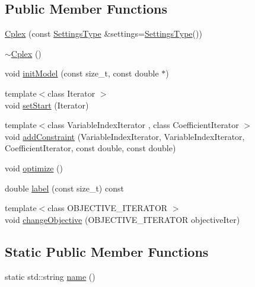 \subsection*{Public Member Functions}
\begin{DoxyCompactItemize}
\item 
\hyperlink{classnifty_1_1ilp__backend_1_1Cplex_ab9abc60e704f82a5b7d480e4fab2e39f}{Cplex} (const \hyperlink{classnifty_1_1ilp__backend_1_1Cplex_a55f68efdbd0060526e09b037be4e6a49}{Settings\+Type} \&settings=\hyperlink{classnifty_1_1ilp__backend_1_1Cplex_a55f68efdbd0060526e09b037be4e6a49}{Settings\+Type}())
\item 
\hyperlink{classnifty_1_1ilp__backend_1_1Cplex_a5bebd6813a2fbb17fa2b5532c3d21000}{$\sim$\+Cplex} ()
\item 
void \hyperlink{classnifty_1_1ilp__backend_1_1Cplex_a52a0ed3e137e56d17daaaf4542d3290c}{init\+Model} (const size\+\_\+t, const double $\ast$)
\item 
{\footnotesize template$<$class Iterator $>$ }\\void \hyperlink{classnifty_1_1ilp__backend_1_1Cplex_a1c773d38cf7a0434247a87ee96531c57}{set\+Start} (Iterator)
\item 
{\footnotesize template$<$class Variable\+Index\+Iterator , class Coefficient\+Iterator $>$ }\\void \hyperlink{classnifty_1_1ilp__backend_1_1Cplex_ac1aca9700667959bb0d99c55ffec16ed}{add\+Constraint} (Variable\+Index\+Iterator, Variable\+Index\+Iterator, Coefficient\+Iterator, const double, const double)
\item 
void \hyperlink{classnifty_1_1ilp__backend_1_1Cplex_aa0055358a4aef6b8b660c14422500b23}{optimize} ()
\item 
double \hyperlink{classnifty_1_1ilp__backend_1_1Cplex_ab15c34e1113706d59f1d795d877942a9}{label} (const size\+\_\+t) const
\item 
{\footnotesize template$<$class O\+B\+J\+E\+C\+T\+I\+V\+E\+\_\+\+I\+T\+E\+R\+A\+T\+OR $>$ }\\void \hyperlink{classnifty_1_1ilp__backend_1_1Cplex_a38bae82b8a54d28471ceb44514bfba18}{change\+Objective} (O\+B\+J\+E\+C\+T\+I\+V\+E\+\_\+\+I\+T\+E\+R\+A\+T\+OR objective\+Iter)
\end{DoxyCompactItemize}
\subsection*{Static Public Member Functions}
\begin{DoxyCompactItemize}
\item 
static std\+::string \hyperlink{classnifty_1_1ilp__backend_1_1Cplex_a35cb51113bf3b858d470f9c742884cdc}{name} ()
\end{DoxyCompactItemize}


